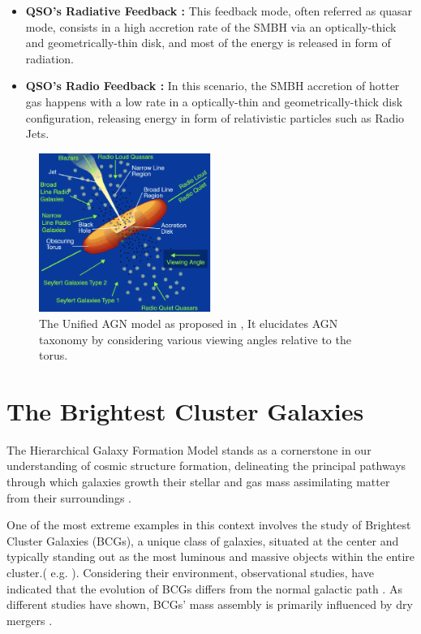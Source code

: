 \begin{itemize}
	\item \textbf{QSO's Radiative Feedback :} This feedback mode, often referred as quasar mode, consists in a high accretion rate of the SMBH via an optically-thick and geometrically-thin disk, and most of the energy is released in form of radiation.
	\item \textbf{QSO's Radio Feedback :} In this scenario, the SMBH accretion of hotter gas happens with a low rate in a optically-thin and geometrically-thick disk configuration, releasing energy in form of relativistic particles such as Radio Jets.
\end{itemize}
\begin{figure}[hbtb]
  \centering
  \includegraphics[width=0.5\textwidth]{UnifiedAGNmodel}
  \caption{The Unified AGN model as proposed in \cite{1995PASP..107..803U}, It elucidates AGN taxonomy by considering various viewing angles relative to the torus.}
  \label{2}
\end{figure}

\section{The Brightest Cluster Galaxies }
The Hierarchical Galaxy Formation Model stands as a cornerstone in our understanding of cosmic structure formation, delineating the principal pathways through which galaxies growth their stellar and gas mass assimilating matter from their surroundings \cite{1994MNRAS.271..781C}.

One of the most extreme examples in this context involves the study of Brightest Cluster Galaxies (BCGs), a unique class of galaxies, situated at the center and typically standing out as the most luminous and massive objects within the entire cluster.( e.g. \cite{2015MNRAS.448....2W} ). Considering their environment, observational studies, have indicated that the evolution of BCGs differs from the normal galactic path \cite{2020MNRAS.498.2719T}. As different studies have shown, BCGs' mass assembly is primarily influenced by dry mergers \cite{2007MNRAS.375....2D, 2019ApJ...881..150C}.

